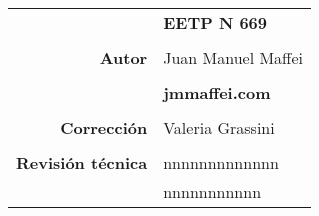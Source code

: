 \thispagestyle{empty}

\begin{center}

\begin{tabular}{r:l}
						& \textbf{\Large EETP N 669}				\\
						&														\\
	{\bf Autor} 		& Juan Manuel Maffei									\\
						&														\\
						& \textbf{\Large jmmaffei.com}							\\
						&														\\
	{\bf Corrección}		& Valeria Grassini 							\\
						&														\\
	{\bf Revisión técnica}	&	nnnnnnnnnnnnn					\\
								&	nnnnnnnnnnn					\\

\end{tabular}

\end{center}



\clearpage
